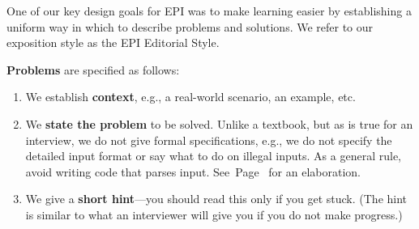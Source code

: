 \documentclass[10pt,openany,twoside,letterpaper,extrafontsizes]{memoir}
\begin{document}
\begin{Spacing}{\introSpacing}


One of our key design goals for EPI was to make
learning easier by establishing a uniform
way in which to describe problems and solutions.
We refer to our exposition style as the EPI Editorial Style.

\noindent\textbf{Problems} are specified as follows:
\begin{enumerate}[label=(\arabic*.), ref=(\arabic*.)]
\item We establish \textbf{context}, e.g., a real-world scenario, an example, etc.
\item We \textbf{state the problem} to be solved. Unlike a textbook, but as is true for an interview, we do
not give formal specifications, e.g., we do not specify the detailed input format
or say what to do on illegal inputs.
As a general rule, avoid writing code that parses input.
See~Page~\pageref{valid-inputs} for an elaboration.
\item We give a \textbf{short hint}---you should read this only if you get stuck. (The hint is similar to what an interviewer
will give you if you do not make progress.)
\end{enumerate}


\end{Spacing}
\end{document}
